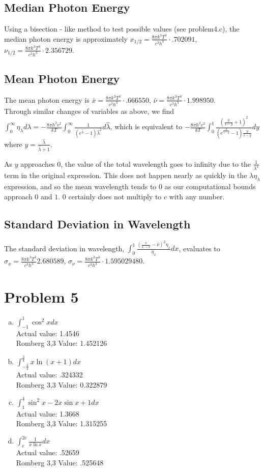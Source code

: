 \documentclass[11pt,fleqn]{article} %
\begin{document}
\subsection*{Median Photon Energy}
Using a bisection - like method to test possible values (see problem4.c), the median photon energy is approximately $x_{1/2} =\frac{8\pi k^3T^3}{c^3h^3} \cdot  .702091$, $\nu_{1/2} = \frac{8\pi k^3T^3}{c^3h^3} \cdot 2.356729$.
\subsection*{Mean Photon Energy}
The mean photon energy is $\bar x =\frac{8\pi k^3T^3}{c^3h^3} \cdot .666550$, $\bar\nu = \frac{8\pi k^3T^3}{c^3h^3} \cdot1.998950$.
\\
Through similar changes of variables as above, we find 
$\int_0^\infty \eta_\lambda d\lambda = -\frac{8\pi h^2 c^2}{kT}  \int_0^\infty \frac{1}{(e^{\hat\lambda}-1) \hat\lambda^2} d\hat\lambda$, which is equivalent to $ -\frac{8\pi h^2 c^2}{kT}  \int_0^1 \frac{(\frac{y}{1-y}+1)^2}{(e^{\frac{y}{1-y}} -1)\frac{y}{1-y}} dy$ where $y = \frac{\hat\lambda}{\hat\lambda +1}$.
\par As $y$ approaches $0$, the value of the total wavelength goes to infinity due to the $\frac{1}{\lambda^4}$ term in the original expression. This does not happen nearly as quickly in the $\lambda \eta_\lambda$ expression, and so the mean wavelength tends to $0$ as our computational bounds approach $0$ and $1$. $0$ certainly does not multiply to $c$ with any number.
\subsection*{Standard Deviation in Wavelength}
The standard deviation in wavelength, $\int_0^1 \frac{(\frac{x}{1-x} - \bar\nu)^2 \eta_x}{\eta_x} dx$, evaluates to $\sigma_x =\frac{8\pi k^3T^3}{c^3h^3} 2.680589$, $\sigma_\nu =  \frac{8\pi k^3T^3}{c^3h^3} \cdot 1.595029480$.

\section*{Problem 5}
\begin{enumerate}[a.)]
\item $\int_{-1}^{1} \cos^2xdx$\\
Actual value: 1.4546 \\
Romberg 3,3 Value: 1.452126

\item $\int_{-\frac{3}{4}}^{\frac{3}{4}} x \ln(x+1) dx$\\
Actual value: .324332 \\
Romberg 3,3 Value: 0.322879

\item $\int_{1}^{4} \sin^2x - 2x\sin x +1 dx$\\
Actual value: 1.3668 \\
Romberg 3,3 Value: 1.315255

\item $\int_{e}^{2e} \frac{1}{x\ln x}dx$\\
Actual value: .52659\\
Romberg 3,3 Value: .525648
\end{enumerate}
\end{document}
